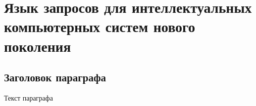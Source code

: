 
\chapter{Язык запросов для интеллектуальных компьютерных систем нового поколения}
\label{chapter_requests}


\section{Заголовок параграфа}
Текст параграфа

%